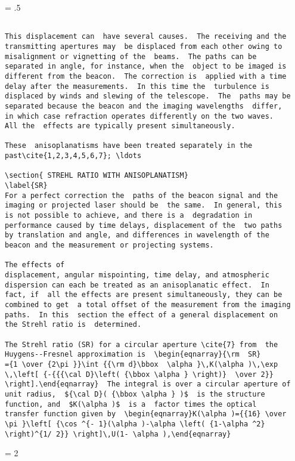 \newpage
\baselineskip = .5\baselineskip  %
\begin{verbatim}

This displacement can  have several causes.  The receiving and the
transmitting apertures may  be displaced from each other owing to
misalignment or vignetting of the  beams.  The paths can be
separated in angle, for instance, when the  object to be imaged is
different from the beacon.  The correction is  applied with a time
delay after the measurements.  In this time the  turbulence is
displaced by winds and slewing of the telescope.  The  paths may be
separated because the beacon and the imaging wavelengths  differ,
in which case refraction operates differently on the two waves.
All the  effects are typically present simultaneously.

These  anisoplanatisms have been treated separately in the
past\cite{1,2,3,4,5,6,7}; \ldots

\section{ STREHL RATIO WITH ANISOPLANATISM}
\label{SR}
For a perfect correction the  paths of the beacon signal and the
imaging or projected laser should be  the same.  In general, this
is not possible to achieve, and there is a  degradation in
performance caused by time delays, displacement of the  two paths
by translation and angle, and differences in wavelength of the
beacon and the measurement or projecting systems.

The effects of
displacement, angular mispointing, time delay, and atmospheric
dispersion can each be treated as an anisoplanatic effect.  In
fact, if  all the effects are present simultaneously, they can be
combined to get  a total offset of the measurement from the imaging
paths.  In this  section the effect of a general displacement on
the Strehl ratio is  determined.

The Strehl ratio (SR) for a circular aperture \cite{7} from  the
Huygens--Fresnel approximation is  \begin{eqnarray}{\rm  SR}
={1 \over {2\pi }}\int {{\rm d}\bbox  \alpha }\,K(\alpha )\,\exp
\,\left[ {-{{{\cal D}\left( {\bbox \alpha } \right)}  \over 2}}
\right].\end{eqnarray}  The integral is over a circular aperture of
unit radius,  ${\cal D}( {\bbox \alpha } )$  is the structure
function, and  $K(\alpha )$  is a  factor times the optical
transfer function given by  \begin{eqnarray}K(\alpha )={{16} \over
\pi }\left[ {\cos ^{- 1}(\alpha )-\alpha \left( {1-\alpha ^2}
\right)^{1/ 2}} \right]\,U(1- \alpha ),\end{eqnarray}

\end{verbatim}
\newpage
\baselineskip = 2\baselineskip  %

